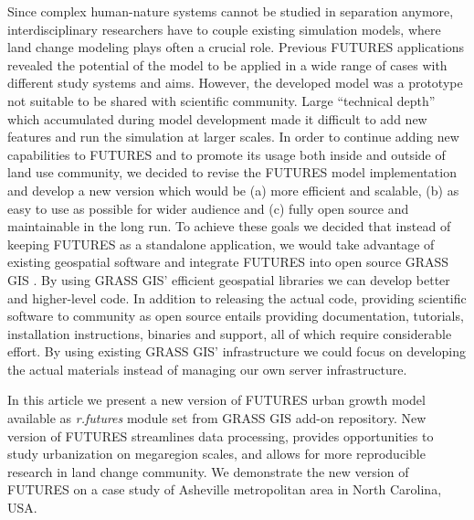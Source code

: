 \documentclass{isprs}
\begin{document}
Since complex human-nature systems cannot be studied in separation anymore,
interdisciplinary researchers have to couple existing simulation models,
where land change modeling plays often a crucial role.
Previous FUTURES applications revealed the potential of the model
to be applied in a wide range of cases with different study systems and aims.
However, the developed model was a prototype not suitable to be shared
with scientific community. Large ``technical depth'' \cite{easterbrook2014open} which
accumulated during model development made it difficult to add new features and run the simulation at larger scales.
In order to continue adding new capabilities to FUTURES and to promote
its usage both inside and outside of land use community,
we decided to revise the FUTURES model implementation
and develop a new version which would be (a) more efficient and scalable, 
(b) as easy to use as possible for wider audience and (c)
fully open source and maintainable in the long run.
To achieve these goals we 
decided that instead of keeping FUTURES as a standalone application,
we would take advantage of existing geospatial software and integrate FUTURES
into open source GRASS GIS \cite{Neteler08}.
By using GRASS GIS' efficient geospatial libraries
we can develop better and higher-level code.
In addition to releasing the
actual code, providing scientific software to community as open
source entails providing documentation, tutorials, installation
instructions, binaries and support, all of which require considerable effort.
By using existing GRASS GIS' infrastructure we could focus on developing the actual materials
instead of managing our own server infrastructure.

In this article we present a new version of FUTURES urban growth model
available as \emph{r.futures} module set from GRASS GIS add-on repository.
New version of FUTURES
streamlines data processing, provides opportunities to study urbanization on megaregion scales,
and allows for more reproducible research in land change community. 
We demonstrate the new version of FUTURES on a case study of 
Asheville metropolitan area in North Carolina, USA.



\end{document}
